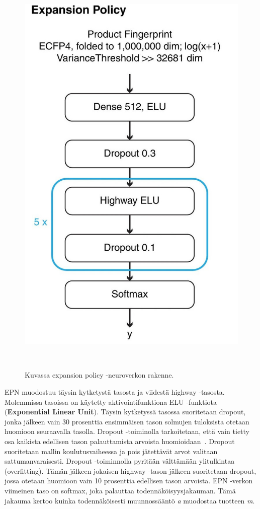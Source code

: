 \documentclass[finnish,twoside,censored,tkt,sw-line]{HYthesisML}
\begin{document}
\begin{figure}[ht]
    \centering
    \includegraphics[]{expansion-policy.jpg}
    \caption{Kuvassa expansion policy -neuroverkon rakenne.}
    {~\cite{SeglerMarwinHS2018Pcsw}}
\end{figure}

EPN muodostuu täysin kytketystä tasosta ja viidestä highway -tasosta.
Molemmissa tasoissa on käytetty aktivointifunktiona ELU -funktiota (\textbf{Exponential Linear Unit}).
Täysin kytketyssä tasossa suoritetaan dropout, jonka jälkeen vain 30 prosenttia ensimmäisen tason solmujen tuloksista otetaan huomioon seuraavalla tasolla.
Dropout -toiminolla tarkoitetaan, että vain tietty osa kaikista edellisen tason palauttamista arvoista huomioidaan~\cite{hinton2012improving}.
Dropout suoritetaan mallin koulutusvaiheessa ja pois jätettävät arvot valitaan sattumanvaraisesti.
Dropout -toiminnolla pyritään välttämään ylitulkintaa (overfitting).
Tämän jälkeen jokaisen highway -tason jälkeen suoritetaan dropout, jossa otetaan huomioon vain 10 prosenttia edellisen tason arvoista.
EPN -verkon viimeinen taso on softmax, joka palauttaa todennäköisyysjakauman.
Tämä jakauma kertoo kuinka todennäköisesti muunnossääntö \emph{a} muodostaa tuotteen \emph{m}.
\end{document}
